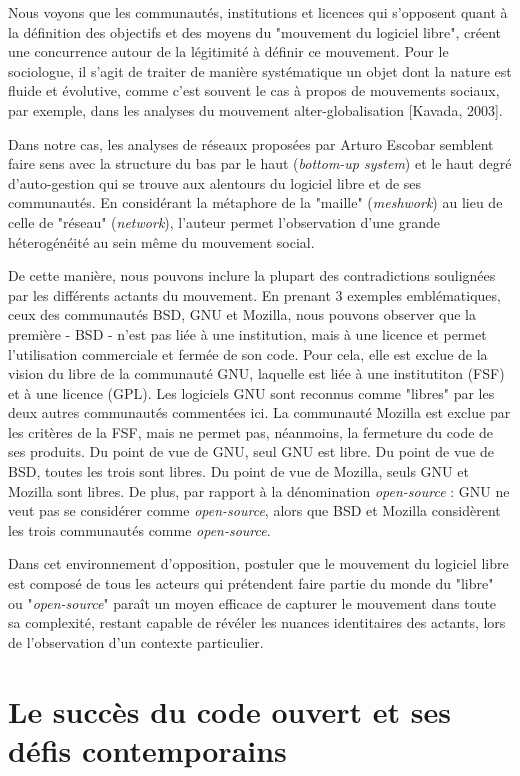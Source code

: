Nous voyons que les communautés, institutions et licences qui s'opposent quant à la définition des objectifs et des moyens du "mouvement du logiciel libre", créent une concurrence autour de la légitimité à définir ce mouvement. Pour le sociologue, il s'agit de traiter de manière systématique un objet dont la nature est fluide et évolutive, comme c'est souvent le cas à propos de mouvements sociaux, par exemple, dans les analyses du mouvement alter-globalisation [Kavada, 2003].

Dans notre cas, les analyses de réseaux proposées par Arturo Escobar \citep{Escobar2003} semblent faire sens avec la structure du bas par le haut (\emph{bottom-up system}) et le haut degré d'auto-gestion qui se trouve aux alentours du logiciel libre et de ses communautés. En considérant la métaphore de la "maille" (\emph{meshwork}) au lieu de celle de "réseau" (\emph{network}), l'auteur permet l'observation d'une grande héterogénéité au sein même du mouvement social.

De cette manière, nous pouvons inclure la plupart des contradictions soulignées par les différents actants du mouvement. En prenant 3 exemples emblématiques, ceux des communautés BSD, GNU et Mozilla, nous pouvons observer que la première - BSD - n'est pas liée à une institution, mais à une licence et permet l'utilisation commerciale et fermée de son code. Pour cela, elle est exclue de la vision du libre de la communauté GNU, laquelle est liée à une institutiton (FSF) et à une licence (GPL). Les logiciels GNU sont reconnus comme "libres" par les deux autres communautés commentées ici. La communauté Mozilla est exclue par les critères de la FSF, mais ne permet pas, néanmoins, la fermeture du code de ses produits. Du point de vue de GNU, seul GNU est libre. Du point de vue de BSD, toutes les trois sont libres. Du point de vue de Mozilla, seuls GNU et Mozilla sont libres. De plus, par rapport à la dénomination \emph{open-source} : GNU ne veut pas se considérer comme \emph{open-source}, alors que BSD et Mozilla considèrent les trois communautés comme \emph{open-source}.

Dans cet environnement d'opposition, postuler que le mouvement du logiciel libre est composé de tous les acteurs qui prétendent faire partie du monde du "libre" ou "\emph{open-source}" paraît un moyen efficace de capturer le mouvement dans toute sa complexité, restant capable de révéler les nuances identitaires des actants, lors de l'observation d'un contexte particulier.

\section{Le succès du code ouvert et ses défis contemporains} \label{1.4}

